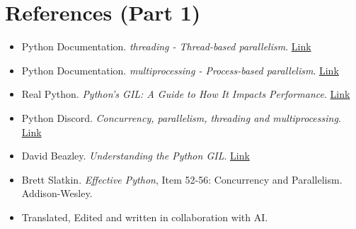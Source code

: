 \documentclass[12pt,letterpaper]{article}
\begin{document}
\section{References (Part 1)}
\begin{itemize}
    \item Python Documentation. \textit{threading - Thread-based parallelism}. \href{https://docs.python.org/3/library/threading.html}{Link}
    
    \item Python Documentation. \textit{multiprocessing - Process-based parallelism}. \href{https://docs.python.org/3/library/multiprocessing.html}{Link}
    
    \item Real Python. \textit{Python's GIL: A Guide to How It Impacts Performance}. \href{https://realpython.com/python-gil/}{Link}
    
    \item Python Discord. \textit{Concurrency, parallelism, threading and multiprocessing}. \href{https://pythondiscord.com/pages/resources/guides/concurrency-parallelism/}{Link}

    \item David Beazley. \textit{Understanding the Python GIL}. \href{https://www.dabeaz.com/python/UnderstandingGIL.pdf}{Link}
    
    \item Brett Slatkin. \textit{Effective Python}, Item 52-56: Concurrency and Parallelism. Addison-Wesley.
    
    \item Translated, Edited and written in collaboration with AI.
\end{itemize}
\end{document}
